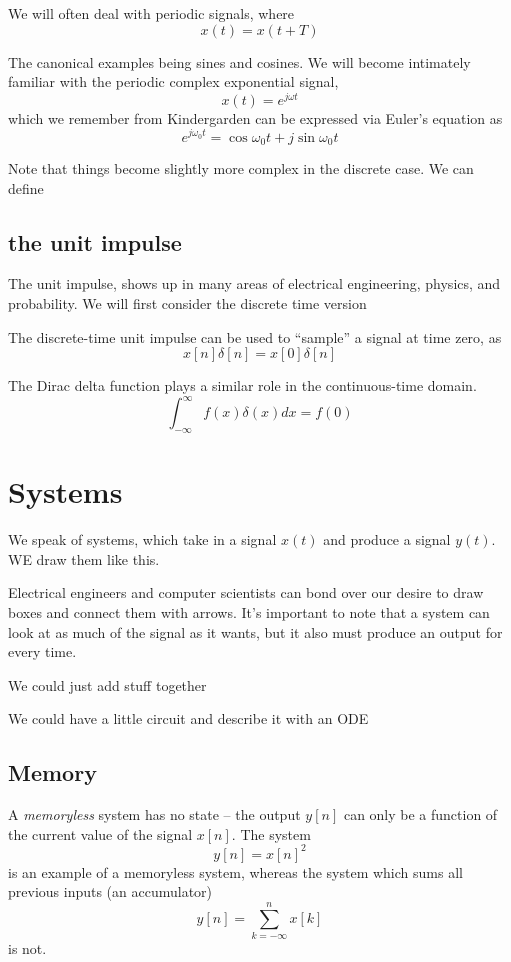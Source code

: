 We will often deal with periodic signals, where
\[
x(t) = x(t+T)
\]

The canonical examples being sines and cosines. We will become intimately 
familiar with the periodic complex exponential signal, 
\[
x(t) = e^{j \omega t}
\]
which we remember from Kindergarden can be expressed via Euler's equation 
as 
\[
e^{j \omega_0 t} = \cos \omega_0 t + j \sin \omega_0 t
\]

Note that things become slightly more complex in the discrete case. We can
define

\subsection{the unit impulse}
The unit impulse, shows up in many areas of electrical
engineering, physics, and probability. We will first consider the 
discrete time version

The discrete-time unit impulse can be used to ``sample'' a signal
at time zero, as
\[
x[n]\delta[n] = x[0]\delta[n]
\]

The Dirac delta function plays a similar role in the continuous-time domain.
\[
\int_{-\infty}^\infty f(x) \delta(x) dx = f(0)
\]

\section{Systems}

We speak of systems, which take in a signal $x(t)$ and produce a signal $y(t)$. WE
draw them like this. 

Electrical engineers and computer scientists can bond over our desire
to draw boxes and connect them with arrows. It's important to note that
a system can look at as much of the signal as it wants, but it also
must produce an output for every time. 

We could just add stuff together

We could have a little circuit and describe it with an ODE


\subsection{Memory}
A \textit{memoryless} system has no state -- the output $y[n]$ can only be a function
of the current value of the signal $x[n]$. The system 
\[
y[n] = x[n]^2
\]
is an example of a memoryless system, whereas the system which sums all previous
inputs (an accumulator) 
\[
y[n] = \sum_{k=-\infty}^n x[k]
\]
is not. 



